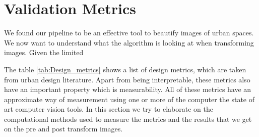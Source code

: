 \section{Validation Metrics}
We found our pipeline to be an effective tool to beautify images of urban spaces. We now want to understand what the algorithm is looking at when transforming images. Given the limited 
 
The table \ref{tab:Design_metrics} shows a list of design metrics, which are taken from urban design literature. Apart from being interpretable, these metrics also have an important property which is measurability. All of these metrics have an approximate way of measurement using one or more of the computer the state of art computer vision tools. In this section we try to elaborate on the computational methods used to measure the metrics and the results that we get on the pre and post transform images. 

